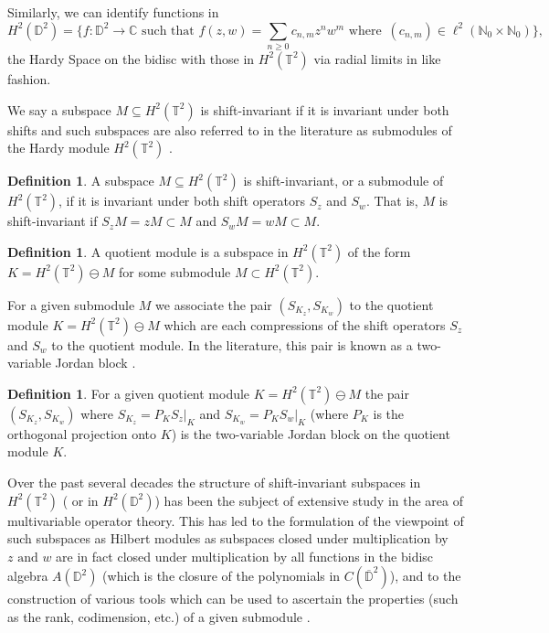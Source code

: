 \documentclass[12pt,reqno]{amsart}
\theoremstyle{definition}
\theoremstyle{definition}
\newtheorem{definition}[theorem]{Definition}
\numberwithin{equation}{section}
\begin{document}
Similarly, we can identify functions in 
\begin{displaymath}
    H^2(\mathbb{D}^2) = \{ f: \mathbb{D}^2 \to \mathbb{C} \, \, \text{such that} \, \, f(z, w) = \underset{n \geq 0}{\sum} c_{n,m}z^nw^m \, \, \text{where} \, \, \, (c_{n, m}) \in \ell^2(\mathbb{N}_0\times \mathbb{N}_0)\},
\end{displaymath} 
the Hardy Space on the bidisc with those in $H^2(\mathbb{T}^2)$ via radial limits in like fashion. 

 We say a subspace $M \subseteq H^2(\mathbb{T}^2)$  is shift-invariant if it is invariant under both shifts and such subspaces are also referred to in the literature as submodules of the Hardy module $H^2(\mathbb{T}^2)$ \cite{CG03,S15,Y18}.

\begin{definition}
A subspace $M \subseteq H^2(\mathbb{T}^2)$  is shift-invariant, or a submodule of $H^2(\mathbb{T}^2)$, if it is invariant under both shift operators $S_z$ and $S_w$. That is, $M$ is shift-invariant if $S_zM = zM \subset M$ and $S_wM = wM \subset M$.
\end{definition}
 \begin{definition}
     A quotient module is a subspace in $H^2(\mathbb{T}^2)$ of the form $K = H^2(\mathbb{T}^2) \ominus M$ for some submodule $M \subset H^2(\mathbb{T}^2)$.
 \end{definition}
For a given submodule $M$ we associate the pair $(S_{K_z}, S_{K_w})$ to the quotient module $K= H^2(\mathbb{T}^2) \ominus M$ which are each compressions of the shift operators $S_z$ and $S_w$ to the quotient module. In the literature, this pair is known as a two-variable Jordan block \cite{LYY11}.
 \begin{definition}
For a given quotient module $K = H^2(\mathbb{T}^2) \ominus M$ the pair $(S_{K_z}, S_{K_w})$ where $S_{K_z} = P_{K} \left.S_{z}\right|_{K} $ and $S_{K_w} = P_{K} \left.S_{w}\right|_{K}$ (where $P_{K}$ is the orthogonal projection onto $K$) is the two-variable Jordan block on the quotient module $K$.
\end{definition}
Over the past several decades \cite{ACD86,CG03,R69,Y18} the structure of shift-invariant subspaces in $H^2(\mathbb{T}^2)$ ( or in $H^2(\mathbb{D}^2)$) has been the subject of extensive study in the area of multivariable operator theory. This has led to the formulation of the viewpoint of such subspaces as Hilbert modules \cite{CG03,DP89,S15} as subspaces closed under multiplication by $z \, \, \text{and} \, \, w$ are in fact closed under multiplication by all functions in the bidisc algebra $A(\mathbb{D}^2)$ (which is the closure of the polynomials in $C(\overline{\mathbb{D}}^2)$), and to the construction of various tools which can be used to ascertain the properties (such as the rank, codimension, etc.) of a given submodule \cite{Y18}. 
\end{document}
